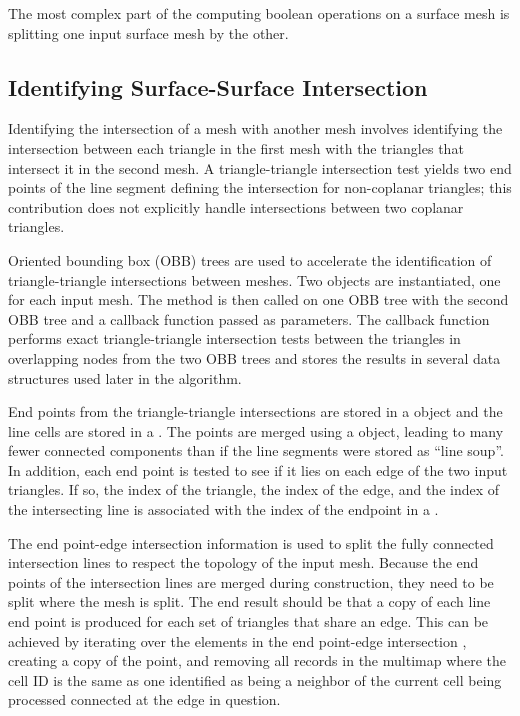 \documentclass{InsightArticle}
\begin{document}
The most complex part of the computing boolean operations on a surface mesh is splitting one input surface mesh by the other. 

\subsection{Identifying Surface-Surface Intersection}

Identifying the intersection of a mesh with another mesh involves identifying the intersection between each triangle in the first mesh with the triangles that intersect it in the second mesh. A triangle-triangle intersection test yields two end points of the line segment defining the intersection for non-coplanar triangles; this contribution does not explicitly handle intersections between two coplanar triangles. 

Oriented bounding box (OBB) trees are used to accelerate the identification of triangle-triangle intersections between meshes. Two  objects are instantiated, one for each input mesh. The method  is then called on one OBB tree with the second OBB tree and a callback function passed as parameters. The callback function performs exact triangle-triangle intersection tests between the triangles in overlapping nodes from the two OBB trees and stores the results in several data structures used later in the algorithm.

End points from the triangle-triangle intersections are stored in a  object and the line cells are stored in a . The points  are merged using a  object, leading to many fewer connected components than if the line segments were stored as ``line soup''. In addition, each end point is tested to see if it lies on each edge of the two input triangles. If so, the index of the triangle, the index of the edge, and the index of the intersecting line is associated with the index of the endpoint in a .

The end point-edge intersection information is used to split the fully connected intersection lines to respect the topology of the input mesh. Because the end points of the intersection lines are merged during construction, they need to be split where the mesh is split. The end result should be that a copy of each line end point is produced for each set of triangles that share an edge. This can be achieved by iterating over the elements in the end point-edge intersection , creating a copy of the point, and removing all records in the multimap where the cell ID is the same as one identified as being a neighbor of the current cell being processed connected at the edge in question.
\end{document}
